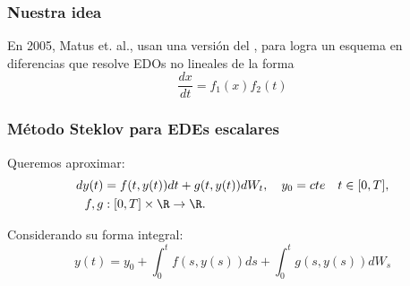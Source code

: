 \begin{frame}
	\begin{bibunit}[apalike]
		\frametitle{Nuestra idea}
		\hypertarget{Idea}{}    
		En 2005, Matus et. al., usan una versión del \hyperlink{dfn:Steklov}{}, 
		para logra un esquema en diferencias  que resolve EDOs no lineales de la forma
		\begin{equation*}
			\frac{dx}{dt}=f_1(x)f_2(t)
		\end{equation*}
		\nocite{matus2005exact}
	\end{bibunit}
\end{frame}

\begin{frame}%
	\frametitle{Método Steklov para EDEs escalares}
	Queremos aproximar:
	\begin{align*}
		dy(t)&=f(t,y(t))dt + g(t,y(t))dW_t, \quad y_0=cte\quad t\in[0,T],\\
		f,g&:[0,T]\times \R \to \R.
	\end{align*}
	\begin{block}{Considerando su forma integral:}
		\begin{equation*}
			y(t) = y_0 + \int_{0}^{t} f(s,y(s))ds
			+\int_{0}^t g(s, y(s))dW_s
		\end{equation*}
	\end{block}
\end{frame}
